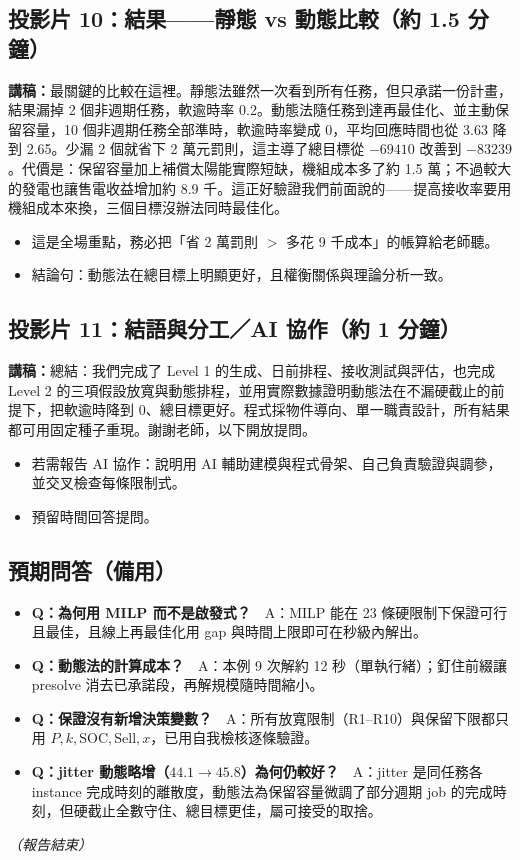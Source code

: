 \documentclass[12pt,a4paper,fontset=none]{ctexart}
\begin{document}
\subsection*{投影片 10：結果——靜態 vs 動態比較（約 1.5 分鐘）}
\textbf{講稿：}最關鍵的比較在這裡。靜態法雖然一次看到所有任務，但只承諾一份計畫，結果漏掉 2 個非週期任務，軟逾時率 0.2。動態法隨任務到達再最佳化、並主動保留容量，10 個非週期任務全部準時，軟逾時率變成 0，平均回應時間也從 3.63 降到 2.65。少漏 2 個就省下 2 萬元罰則，這主導了總目標從 $-69410$ 改善到 $-83239$。代價是：保留容量加上補償太陽能實際短缺，機組成本多了約 1.5 萬；不過較大的發電也讓售電收益增加約 8.9 千。這正好驗證我們前面說的——提高接收率要用機組成本來換，三個目標沒辦法同時最佳化。
\begin{itemize}
  \item 這是全場重點，務必把「省 2 萬罰則 $>$ 多花 9 千成本」的帳算給老師聽。
  \item 結論句：動態法在總目標上明顯更好，且權衡關係與理論分析一致。
\end{itemize}

\subsection*{投影片 11：結語與分工／AI 協作（約 1 分鐘）}
\textbf{講稿：}總結：我們完成了 Level 1 的生成、日前排程、接收測試與評估，也完成 Level 2 的三項假設放寬與動態排程，並用實際數據證明動態法在不漏硬截止的前提下，把軟逾時降到 0、總目標更好。程式採物件導向、單一職責設計，所有結果都可用固定種子重現。謝謝老師，以下開放提問。
\begin{itemize}
  \item 若需報告 AI 協作：說明用 AI 輔助建模與程式骨架、自己負責驗證與調參，並交叉檢查每條限制式。
  \item 預留時間回答提問。
\end{itemize}

\subsection*{預期問答（備用）}
\begin{itemize}
  \item \textbf{Q：為何用 MILP 而不是啟發式？}　A：MILP 能在 23 條硬限制下保證可行且最佳，且線上再最佳化用 gap 與時間上限即可在秒級內解出。
  \item \textbf{Q：動態法的計算成本？}　A：本例 9 次解約 12 秒（單執行緒）；釘住前綴讓 presolve 消去已承諾段，再解規模隨時間縮小。
  \item \textbf{Q：保證沒有新增決策變數？}　A：所有放寬限制（R1--R10）與保留下限都只用 $P,k,\mathrm{SOC},\mathrm{Sell},x$，已用自我檢核逐條驗證。
  \item \textbf{Q：jitter 動態略增（$44.1\to 45.8$）為何仍較好？}　A：jitter 是同任務各 instance 完成時刻的離散度，動態法為保留容量微調了部分週期 job 的完成時刻，但硬截止全數守住、總目標更佳，屬可接受的取捨。
\end{itemize}

\vspace{1cm}
\begin{center}\textit{（報告結束）}\end{center}
\end{document}

